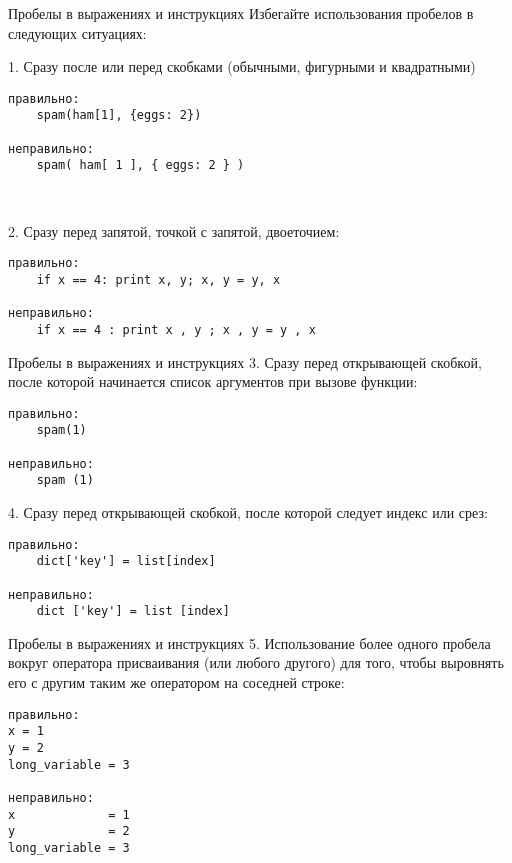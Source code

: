 \documentclass[xcolor=table]{beamer}
\begin{document}
\begin{frame}[fragile]{Пробелы в выражениях и инструкциях}
	Избегайте использования пробелов в следующих ситуациях:
	
	1. Сразу после или перед скобками (обычными, фигурными и квадратными)
	\begin{verbatim}
правильно:
    spam(ham[1], {eggs: 2})

неправильно:
    spam( ham[ 1 ], { eggs: 2 } )	
	\end{verbatim}
	
	~
	
	2. Сразу перед запятой, точкой с запятой, двоеточием:
	\begin{verbatim}
правильно:
    if x == 4: print x, y; x, y = y, x

неправильно:
    if x == 4 : print x , y ; x , y = y , x
	\end{verbatim}
\end{frame}

\begin{frame}[fragile]{Пробелы в выражениях и инструкциях}
	3. Сразу перед открывающей скобкой, после которой начинается список аргументов при вызове функции:
	\begin{verbatim}
правильно:
    spam(1)

неправильно:
    spam (1)	
	\end{verbatim}
	
	4. Сразу перед открывающей скобкой, после которой следует индекс или срез:
	\begin{verbatim}
правильно:
    dict['key'] = list[index]

неправильно:
    dict ['key'] = list [index]	
	\end{verbatim}
\end{frame}

\begin{frame}[fragile]{Пробелы в выражениях и инструкциях}
	5. Использование более одного пробела вокруг оператора присваивания (или любого другого) для того, чтобы выровнять его с другим таким же оператором на соседней строке:
	\begin{verbatim}
правильно:
x = 1 
y = 2 
long_variable = 3 

неправильно:
x             = 1 
y             = 2 
long_variable = 3
	\end{verbatim}
\end{frame}
\end{document}
